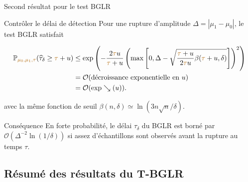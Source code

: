 \documentclass[11pt,french,ignorenonframetext,]{beamer}
\begin{document}
\begin{frame}{Second résultat pour le test BGLR \dSmiley{}}

  \begin{block}{Contrôler le délai de détection}
      Pour une rupture d'amplitude $\Delta = |\mu_1 - \mu_0|$,
      le test BGLR satisfait
      \begin{small}
        \begin{align*}
            \mathbb{P}_{\textcolor{gold}{\mu_0,\mu_1,\tau}} (\widehat{\tau}_{\delta} \geq \textcolor{gold}{\tau} + u) &\leq \exp\left( -\frac{2\textcolor{gold}{\tau} u}{\textcolor{gold}{\tau} + u}\left(\max\left[ 0, \Delta - \sqrt{\frac{\textcolor{gold}{\tau} + u}{2\textcolor{gold}{\tau} u} \beta(\textcolor{gold}{\tau} + u,\delta)} \right]\right)^2 \right) \\
            &= \mathcal{O}(\text{décroissance exponentielle en~} u) \\
            &= \mathcal{O}(\exp\searrow(u)).
        \end{align*}
      \end{small}
      avec la même fonction de seuil
      $\beta(n,\delta) \simeq \ln(3n \sqrt{n}/\delta)$.
  \end{block}

  \begin{exampleblock}{Conséquence}
    En forte probabilité, \alert{le délai $\widehat{\tau}_\delta$ du BGLR est borné} par $\mathcal{O}(\Delta^{-2} \ln(1/\delta))$ \alert{si assez d'échantillons sont observés avant la rupture} au temps $\tau$.
  \end{exampleblock}

\end{frame}


\subsection{\hfill{}Résumé des résultats du T-BGLR\hfill{}}
\end{document}
